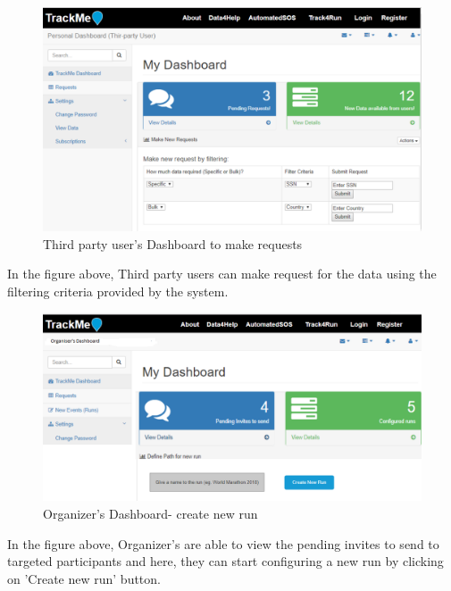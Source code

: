 \documentclass[a4paper, hidelinks, 12pt]{report}
\begin{document}
	\begin{figure}[H]
		\centering
		\includegraphics[scale=0.35]{../Assets/Make_Request.png}\caption[UI: Third party user's Dashboard to make requests]{Third party user's Dashboard to make requests}
		\label{fig:Make_Request}
	\end{figure}
	
	In the figure above, Third party users can make request for the data using the filtering criteria provided by the system.
	
	\begin{figure}[H]
		\centering
		\includegraphics[scale=0.35]{../Assets/organizer_dashboard_1.png}\caption[UI: Organiser's Dashboard - create new run]{Organizer's Dashboard- create new run}
		\label{fig:Make_Request}
	\end{figure}
	
	In the figure above, Organizer's are able to view the pending invites to send to targeted participants and here, they can start configuring a new run by clicking on 'Create new run' button.
	
\end{document}
